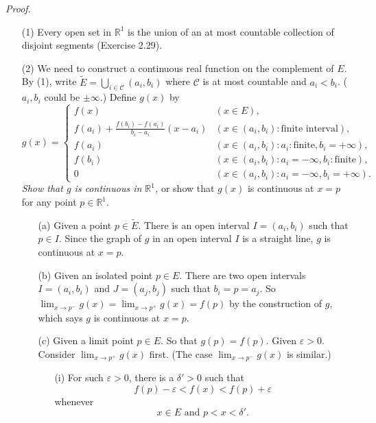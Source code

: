\documentclass{article}
\begin{document}
\emph{Proof.}
\begin{enumerate}
\item[(1)]
Every open set in $\mathbb{R}^1$ is the union of an at most countable collection
of disjoint segments (Exercise 2.29).
\item[(2)]
We need to construct a continuous real function on the complement of $E$.
By (1), write $\widetilde{E} = \bigcup_{i \in \mathscr{C}} (a_i, b_i)$
where $\mathscr{C}$ is at most countable and
$a_i < b_i$. ($a_i, b_i$ could be $\pm \infty$.)
Define $g(x)$ by
\begin{equation*}
  g(x) =
    \begin{cases}
      f(x)
        & (x \in E), \\
      f(a_i) + \frac{f(b_i)-f(a_i)}{b_i-a_i}(x - a_i)
        & (x \in (a_i, b_i):\text{finite interval}), \\
      f(a_i)
        & (x \in (a_i, b_i): a_i:\text{finite}, b_i = +\infty), \\
      f(b_i)
        & (x \in (a_i, b_i): a_i = -\infty, b_i:\text{finite}), \\
      0
        & (x \in (a_i, b_i): a_i = -\infty, b_i = +\infty).
    \end{cases}
\end{equation*}
\emph{Show that $g$ is continuous in $\mathbb{R}^1$,}
or show that $g(x)$ is continuous at $x = p$ for any point $p \in \mathbb{R}^1$.
\begin{enumerate}
  \item[(a)]
  Given a point $p \in \widetilde{E}$. There is an open interval $I = (a_i, b_i)$
  such that $p \in I$.
  Since the graph of $g$ in an open interval $I$ is a straight line,
  $g$ is continuous at $x = p$.
  \item[(b)]
  Given an isolated point $p \in E$.
  There are two open intervals $I = (a_i, b_i)$ and $J = (a_j, b_j)$
  such that $b_i = p = a_j$.
  So $\lim_{x \to p^{-}} g(x) = \lim_{x \to p^{+}} g(x) = f(p)$
  by the construction of $g$, which says $g$ is continuous at $x = p$.
  \item[(c)]
  Given a limit point $p \in E$. So that $g(p) = f(p)$.
  Given $\varepsilon > 0$.
  Consider $\lim_{x \to p^{+}} g(x)$ first.
  (The case $\lim_{x \to p^{-}} g(x)$ is similar.)
    \begin{enumerate}
    \item[(i)]
    For such $\varepsilon > 0$, there is a $\delta' > 0$ such that
    $$f(p)-\varepsilon < f(x) < f(p)+\varepsilon$$
    whenever
    $$x \in E \text{ and } p < x < \delta'.$$

\end{enumerate}
\end{enumerate}
\end{enumerate}
\end{document}
